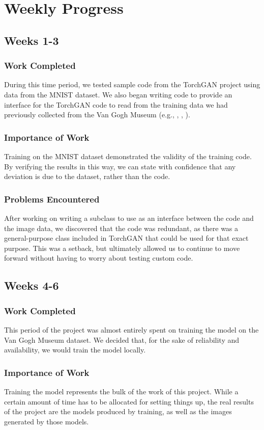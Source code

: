 \documentclass[12pt,letterpaper]{article}
\begin{document}
	\section{Weekly Progress}
	\subsection{Weeks 1-3}
	\subsubsection{Work Completed}
	During this time period, we tested sample code from the TorchGAN\cite{pal2019torchgan} project using data from the MNIST\cite{lecun2010mnist} dataset.
	We also began writing code to provide an interface for the TorchGAN code to read from the training data we had previously collected from the Van Gogh Museum (e.g., \cite{001}, \cite{002}, \cite{003}).

	\subsubsection{Importance of Work}
	Training on the MNIST dataset demonstrated the validity of the training code.
	By verifying the results in this way, we can state with confidence that any deviation is due to the dataset, rather than the code.

	\subsubsection{Problems Encountered}
	After working on writing a subclass to use as an interface between the code and the image data, we discovered that the code was redundant, as there was a general-purpose class included in TorchGAN that could be used for that exact purpose.
	This was a setback, but ultimately allowed us to continue to move forward without having to worry about testing custom code.

	\subsection{Weeks 4-6}
	\subsubsection{Work Completed}
	This period of the project was almost entirely spent on training the model on the Van Gogh Museum dataset.
	We decided that, for the sake of reliability and availability, we would train the model locally.
	\subsubsection{Importance of Work}
	Training the model represents the bulk of the work of this project.
	While a certain amount of time has to be allocated for setting things up, the real results of the project are the models produced by training, as well as the images generated by those models.
\end{document}
